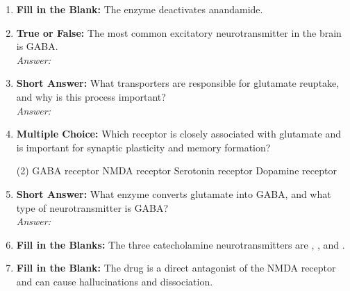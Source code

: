 \begin{enumerate}[label=\textbf{Q3.3.\arabic*}]
    \item \textbf{Fill in the Blank:} The enzyme \underline{\hspace{3cm}} deactivates anandamide.

    \item \textbf{True or False:} The most common excitatory neurotransmitter in the brain is GABA. \\
        \textit{Answer:} %



    \item \textbf{Short Answer:} What transporters are responsible for glutamate reuptake, and why is this process important? \\
        \textit{Answer:} \\%

    \item \textbf{Multiple Choice:} Which receptor is closely associated with glutamate and is important for synaptic plasticity and memory formation?
        \begin{tasks}[label=\textcolor{\documentTheme}{(\Alph*)}, item-format=\color{\documentTheme}, label-width=1.5em, item-indent=1.7em](2)
            \task GABA receptor
            \task NMDA receptor
            \task Serotonin receptor
            \task Dopamine receptor
        \end{tasks}

    \item \textbf{Short Answer:} What enzyme converts glutamate into GABA, and what type of neurotransmitter is GABA? \\
        \textit{Answer:} \\%
    
    \item \textbf{Fill in the Blanks:} The three catecholamine neurotransmitters are \underline{\hspace{3cm}}, \underline{\hspace{3cm}}, and \underline{\hspace{3cm}}.

    \item \textbf{Fill in the Blank:} The drug \underline{\hspace{3cm}} is a direct antagonist of the NMDA receptor and can cause hallucinations and dissociation.


\end{enumerate}
